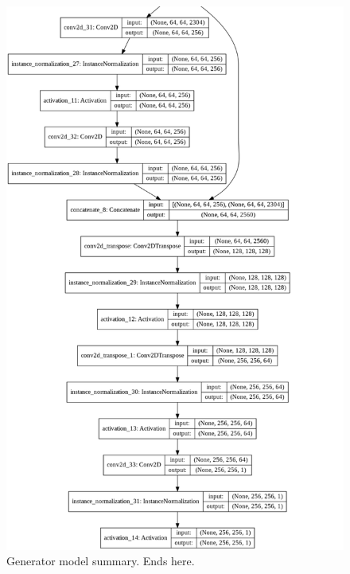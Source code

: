 \begin{figure}[H]
        \vspace*{1cm}
	    \begin{center} 
	    \includegraphics[scale=0.50]{images/Appendix/generator_6.png}
	    \caption{Generator model summary. Ends here.}
	    \end{center}
\end{figure}


